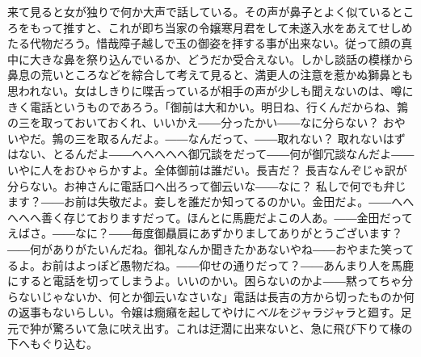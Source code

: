 \documentclass[12pt, openright]{book}
\begin{document}
来て見ると女が独りで何か大声で話している。その声が鼻子とよく似ているところをもって推すと、これが即ち当家の令嬢寒月君をして未遂入水をあえてせしめたる代物だろう。惜哉障子越しで玉の御姿を拝する事が出来ない。従って顔の真中に大きな鼻を祭り込んでいるか、どうだか受合えない。しかし談話の模様から鼻息の荒いところなどを綜合して考えて見ると、満更人の注意を惹かぬ獅鼻とも思われない。女はしきりに喋舌っているが相手の声が少しも聞えないのは、噂にきく電話というものであろう。「御前は大和かい。明日ね、行くんだからね、鶉の三を取っておいておくれ、いいかえ――分ったかい――なに分らない？ おやいやだ。鶉の三を取るんだよ。――なんだって、――取れない？ 取れないはずはない、とるんだよ――へへへへへ御冗談をだって――何が御冗談なんだよ――いやに人をおひゃらかすよ。全体御前は誰だい。長吉だ？ 長吉なんぞじゃ訳が分らない。お神さんに電話口へ出ろって御云いな――なに？ 私しで何でも弁じます？――お前は失敬だよ。妾しを誰だか知ってるのかい。金田だよ。――へへへへへ善く存じておりますだって。ほんとに馬鹿だよこの人あ。――金田だってえばさ。――なに？――毎度御贔屓にあずかりましてありがとうございます？――何がありがたいんだね。御礼なんか聞きたかあないやね――おやまた笑ってるよ。お前はよっぽど愚物だね。――仰せの通りだって？――あんまり人を馬鹿にすると電話を切ってしまうよ。いいのかい。困らないのかよ――黙ってちゃ分らないじゃないか、何とか御云いなさいな」電話は長吉の方から切ったものか何の返事もないらしい。令嬢は癇癪を起してやけに\emph{ベル}をジャラジャラと廻す。足元で狆が驚ろいて急に吠え出す。これは迂濶に出来ないと、急に飛び下りて椽の下へもぐり込む。
\end{document}
